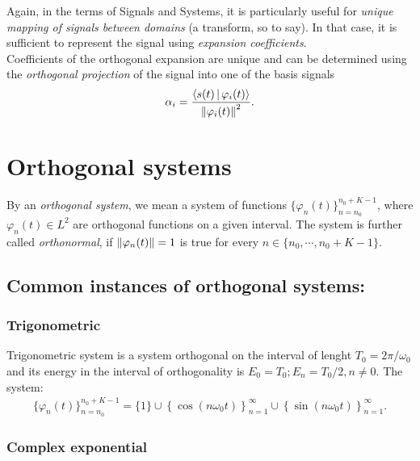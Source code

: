 \documentclass[11pt,a4paper]{report}
\theoremstyle{remark}
\theoremstyle{definition}
\begin{document}
				Again, in the terms of Signals and Systems, it is particularly useful for \textit{unique mapping of signals between domains} (a transform, so to say). In that case, it is sufficient to represent the signal using \textit{expansion coefficients}. \\
				Coefficients of the orthogonal expansion are unique and can be determined using the \textit{orthogonal projection} of the signal into one of the basis signals
				\begin{align}
					\label{def:ortproj}
					\alpha_i = \frac{\langle s(t)\,|\,\varphi_i(t)\rangle}{\left\lVert\varphi_i(t)\right\rVert^2}.
				\end{align}
			
		\section{Orthogonal systems}
		
			By an \textit{orthogonal system}, we mean a system of functions $\{\varphi_n(t)\}_{n=n_0}^{n_0+K-1}$, where $\varphi_n(t) \in L^2$ are orthogonal functions on a given interval. The system is further called \textit{orthonormal}, if $\left\lVert\varphi_n(t)\right\rVert = 1$ is true for every $n \in \{ n_0, \cdots, n_0+K-1 \}.$
				
			\subsection{Common instances of orthogonal systems:}
				
				\subsubsection{Trigonometric}
				
					Trigonometric system is a system orthogonal on the interval of lenght $T_0 = 2 \pi / \omega_0$ and its energy in the interval of orthogonality is $E_0 = T_0; E_n = T_0/2, n \not= 0$. The system:
					\begin{align}
						\label{eq:trigorthsys}
						\{\varphi_n(t)\}_{n=n_0}^{n_0+K-1} = \{1\} \cup \left\{ \cos(n \omega_0 t) \right\}_{n=1}^{\infty} \cup \left\{ \sin(n \omega_0 t) \right\}_{n=1}^{\infty}.
					\end{align}
					
				\subsubsection{Complex exponential}
					
\end{document}
